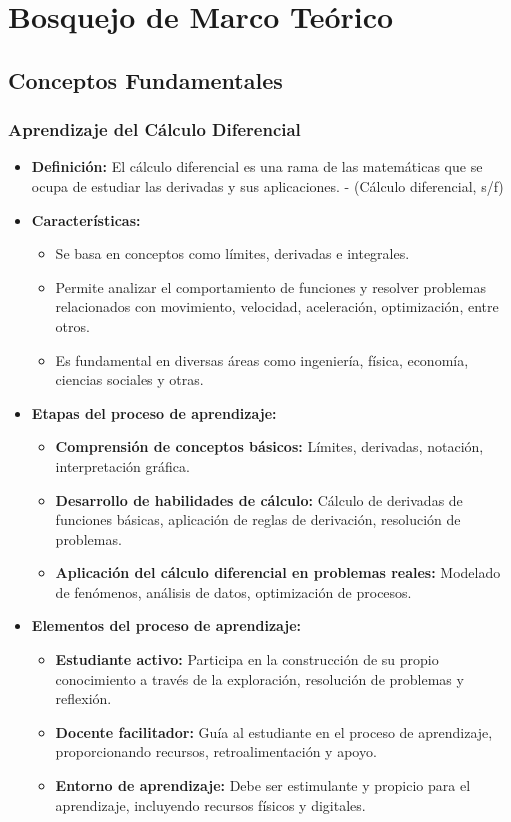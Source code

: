 \documentclass{article}
\begin{document}
\section{Bosquejo de Marco Teórico}

\subsection{Conceptos Fundamentales}

\subsubsection{Aprendizaje del Cálculo Diferencial}
\begin{itemize}
  \item \textbf{Definición:} El cálculo diferencial es una rama de las matemáticas que se ocupa de estudiar las derivadas y sus aplicaciones. \cite{Cálculo diferencial} - (Cálculo diferencial, s/f)
  \item \textbf{Características:}
  \begin{itemize}
    \item Se basa en conceptos como límites, derivadas e integrales.
    \item Permite analizar el comportamiento de funciones y resolver problemas relacionados con movimiento, velocidad, aceleración, optimización, entre otros.
    \item Es fundamental en diversas áreas como ingeniería, física, economía, ciencias sociales y otras.
  \end{itemize}
  \item \textbf{Etapas del proceso de aprendizaje:}
  \begin{itemize}
    \item \textbf{Comprensión de conceptos básicos: }Límites, derivadas, notación, interpretación gráfica.
    \item \textbf{Desarrollo de habilidades de cálculo: }Cálculo de derivadas de funciones básicas, aplicación de reglas de derivación, resolución de problemas.
    \item \textbf{Aplicación del cálculo diferencial en problemas reales: }Modelado de fenómenos, análisis de datos, optimización de procesos.
  \end{itemize}
  \item \textbf{Elementos del proceso de aprendizaje:}
  \begin{itemize}
    \item \textbf{Estudiante activo: }Participa en la construcción de su propio conocimiento a través de la exploración, resolución de problemas y reflexión.
    \item \textbf{Docente facilitador: }Guía al estudiante en el proceso de aprendizaje, proporcionando recursos, retroalimentación y apoyo.
    \item \textbf{Entorno de aprendizaje: }Debe ser estimulante y propicio para el aprendizaje, incluyendo recursos físicos y digitales.
  \end{itemize} 
\end{itemize}
\end{document}
